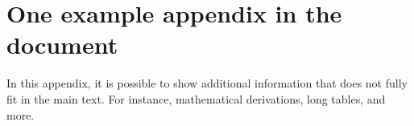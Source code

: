 \pagestyle{MyThesisStyle}
\chapter[\MakeUppercase{One Appendix}]{One example appendix in the document}\label{app:appendix_01}

In this appendix, it is possible to show additional information that does not fully fit in the main text. For instance, mathematical derivations, long tables, and more.


